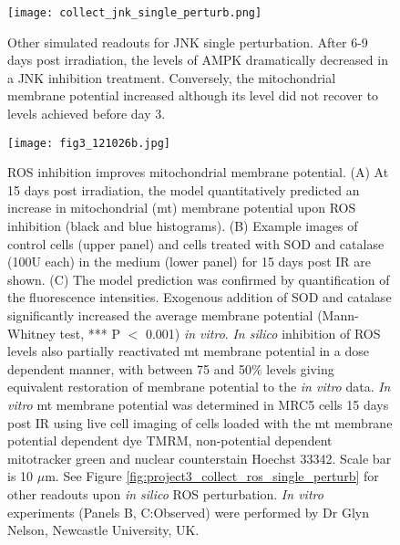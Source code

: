 \begin{figure}[tb]
	\begin{center}
		\texttt{[image: collect\_jnk\_single\_perturb.png]}
		\caption[Other simulated readouts for JNK single perturbation]{Other simulated readouts for JNK single perturbation. After 6-9 days post irradiation, the levels of AMPK dramatically decreased in a JNK inhibition treatment. Conversely, the mitochondrial membrane potential increased although its level did not recover to levels achieved before day 3.}
		\label{fig:project3_collect_jnk_single_perturb}
	\end{center}
\end{figure}
\clearpage


\begin{figure}[tb]
	\begin{center}
		\texttt{[image: fig3\_121026b.jpg]}
		\caption[ROS inhibition improves mitochondrial membrane potential]{ROS inhibition improves mitochondrial membrane potential. (A) At 15 days post irradiation, the model quantitatively predicted an increase in mitochondrial (mt) membrane potential upon ROS inhibition (black and blue histograms). (B) Example images of control cells (upper panel) and cells treated with SOD and catalase (100U each) in the medium (lower panel) for 15 days post IR are shown. (C) The model prediction was confirmed by quantification of the fluorescence intensities. Exogenous addition of SOD and catalase significantly increased the average membrane potential (Mann-Whitney test, *** P $<$ 0.001) \emph{in vitro}. \emph{In silico} inhibition of ROS levels also partially reactivated mt membrane potential in a dose dependent manner, with between 75 and 50\% levels giving equivalent restoration of membrane potential to the \emph{in vitro} data. \emph{In vitro} mt membrane potential was determined in MRC5 cells 15 days post IR using live 
cell imaging of cells loaded with the mt membrane potential dependent dye TMRM, non-potential dependent mitotracker green and nuclear counterstain Hoechst 33342. Scale bar is 10 $\mu$m. See Figure \ref{fig:project3_collect_ros_single_perturb} for other readouts upon \emph{in silico} ROS perturbation. \emph{In vitro} experiments (Panels B, C:Observed) were performed by Dr Glyn Nelson, Newcastle University, UK.}
		\label{fig:project3_fig3_121026b}
	\end{center}
\end{figure}
\clearpage

